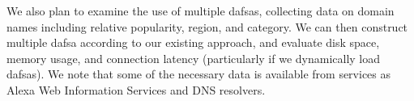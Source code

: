 We also plan to examine the use of multiple \acp{dafsa}, collecting data on
domain names including relative popularity, region, and category. We can then
construct multiple \ac{dafsa} according to our existing approach, and evaluate
disk space, memory usage, and connection latency (particularly if we dynamically
load \acp{dafsa}). We note that some of the necessary data is available from services
as Alexa Web Information Services and DNS resolvers.
